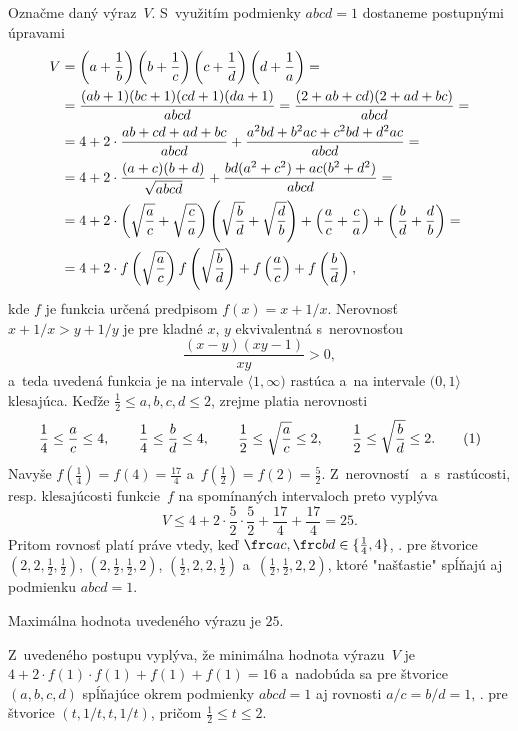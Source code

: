 {%
Označme daný výraz~$V$. S~využitím podmienky $abcd=1$ dostaneme postupnými úpravami
$$
\aligned
V&=\left(a+\frac1b\right)\left(b+\frac1c\right)\left(c+\frac1d\right)\left(d+\frac1a\right)=\\
&=\frac{(ab+1)(bc+1)(cd+1)(da+1)}{abcd}=
\frac{(2+ab+cd)(2+ad+bc)}{abcd}=\\
&=4+2\cdot\frac{ab+cd+ad+bc}{abcd}+\frac{a^2bd+b^2ac+c^2bd+d^2ac}{abcd}=\\
&=4+2\cdot\frac{(a+c)(b+d)}{\sqrt{abcd}}+\frac{bd(a^2+c^2)+ac(b^2+d^2)}{abcd}=\\
&=4+2\cdot\left(\sqrt{\frac ac}+\sqrt{\frac ca}\right)\left(\sqrt{\frac bd}+\sqrt{\frac db}\right)+
\left(\frac ac+\frac ca\right)+\left(\frac bd+\frac db\right)=\\
&=4+2\cdot f\left(\sqrt{\frac ac}\right)f\left(\sqrt{\frac bd}\right)+f\left(\frac ac\right)+f\left(\frac bd\right),
\endaligned
$$
kde $f$ je funkcia určená predpisom $f(x)=x+1/x$. Nerovnosť $x+1/x>y+1/y$ je pre kladné $x$, $y$ ekvivalentná s~nerovnosťou
$$
\frac{(x-y)(xy-1)}{xy}>0,
$$
a~teda uvedená funkcia je na intervale $\langle1,\infty)$ rastúca a~na intervale $(0,1\rangle$ klesajúca. Keďže $\frac12\le a,b,c,d\le2$, zrejme platia nerovnosti
$$
\frac14\le\frac ac\le4,\qquad \frac14\le\frac bd\le4, \qquad
\frac12\le\sqrt{\frac ac}\le2,\qquad \frac12\le\sqrt{\frac bd}\le2.
\tag1
$$
Navyše $f(\frac14)=f(4)=\frac{17}4$ a~$f(\frac12)=f(2)=\frac52$. Z~nerovností~ a~s~rastúcosti, resp. klesajúcosti funkcie~$f$ na spomínaných intervaloch preto vyplýva
$$
V \le 4+2\cdot\frac52\cdot\frac52+\frac{17}4+\frac{17}4=25.
$$
Pritom rovnosť platí práve vtedy, keď $\frc ac,\frc bd\in\{\frac14,4\}$, \tj. pre štvorice $(2,2,\frac12,\frac12)$, $(2,\frac12,\frac12,2)$, $(\frac12,2,2,\frac12)$ a~$(\frac12,\frac12,2,2)$, ktoré "našťastie" spĺňajú aj podmienku $abcd=1$.

\odpoved
Maximálna hodnota uvedeného výrazu je $25$.

\poznamka
Z~uvedeného postupu vyplýva, že minimálna hodnota výrazu~$V$ je $4+2\cdot f(1)\cdot f(1)+f(1)+f(1)=16$ a~nadobúda sa pre štvorice $(a,b,c,d)$ spĺňajúce okrem podmienky $abcd=1$ aj rovnosti $a/c=b/d=1$, \tj. pre štvorice $(t,1/t,t,1/t)$, pričom $\frac12\le t\le2$.
}

